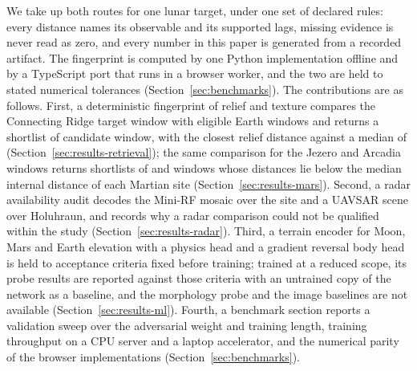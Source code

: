 We take up both routes for one lunar target, under one set of declared rules: every distance names
its observable and its supported lags, missing evidence is never read as zero, and every number in
this paper is generated from a recorded artifact. The fingerprint is computed by one Python
implementation offline and by a TypeScript port that runs in a browser worker, and the two are held
to stated numerical tolerances (Section~\ref{sec:benchmarks}). The contributions are as follows.
First, a deterministic fingerprint of relief and texture compares the Connecting Ridge target
window with \ComparedCount{} eligible Earth windows and returns a shortlist of
\ShortlistCount{} candidate window, with the closest relief distance \BestReliefDistance{} against a median of \ReliefDistanceMedian{} (Section~\ref{sec:results-retrieval}); the same comparison for the Jezero and Arcadia windows returns shortlists of \JezeroShortlistSize{} and \ArcadiaShortlistSize{} windows whose distances lie below the median internal distance of each Martian site (Section~\ref{sec:results-mars}). Second, a radar availability audit decodes the
Mini-RF mosaic over the site and a UAVSAR scene over Holuhraun, and records why a radar comparison
could not be qualified within the study (Section~\ref{sec:results-radar}). Third, a terrain encoder for Moon, Mars and Earth elevation with a physics head and a gradient reversal body head is held to acceptance criteria fixed before training; trained at a reduced scope, its probe results are reported against those criteria with an untrained copy of the network as a baseline, and the morphology probe and the image baselines are not available (Section~\ref{sec:results-ml}). Fourth, a benchmark section reports a validation sweep over the adversarial weight and training length, training throughput on a CPU server and a laptop accelerator, and the numerical parity of the browser implementations (Section~\ref{sec:benchmarks}).
